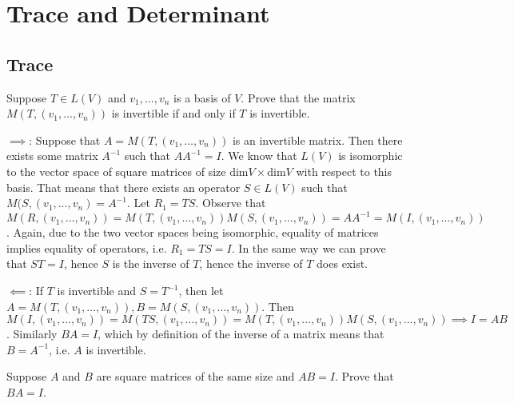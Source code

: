 \chapter{Trace and Determinant}

\section{Trace}

\begin{exercise}{1}
    Suppose $T \in L(V)$ and $v_1, \ldots, v_n$ is a basis of $V$. Prove that the matrix $M(T, (v_1, \ldots, v_n))$ is invertible if and only if $T$ is invertible.
\end{exercise}

\begin{solution}

    $\implies$: Suppose that $A = M(T, (v_1, \ldots, v_n))$ is an invertible matrix. Then there exists some matrix $A^{-1}$ such that $AA^{-1} = I$. We know that $L(V)$ is isomorphic to the vector space of square matrices of size $\text{dim} V \times \text{dim} V$ with respect to this basis. That means that there exists an operator $S \in L(V)$ such that $M(S, (v_1, \ldots, v_n) = A^{-1}$. Let $R_1 = TS$. Observe that 
    $$M(R, (v_1, \ldots, v_n)) = M(T, (v_1, \ldots, v_n))M(S, (v_1, \ldots, v_n)) = AA^{-1} = M(I, (v_1, \ldots, v_n))$$.
    Again, due to the two vector spaces being isomorphic, equality of matrices implies equality of operators, i.e. $R_1 = TS = I$. In the same way we can prove that $ST = I$, hence $S$ is the inverse of $T$, hence the inverse of $T$ does exist.

    $\impliedby$: If $T$ is invertible and $S = T^{-1}$, then let $A = M(T, (v_1, \ldots, v_n)), B = M(S, (v_1, \ldots, v_n))$. Then $M(I, (v_1, \ldots, v_n)) = M(TS, (v_1, \ldots, v_n)) = M(T, (v_1, \ldots, v_n))M(S, (v_1, \ldots, v_n)) \implies I = AB$. Similarly $BA = I$, which by definition of the inverse of a matrix means that $B = A^{-1}$, i.e. $A$ is invertible.
\end{solution}

\begin{exercise}{2}
    Suppose $A$ and $B$ are square matrices of the same size and $AB = I$. Prove that $BA = I$.
\end{exercise}

